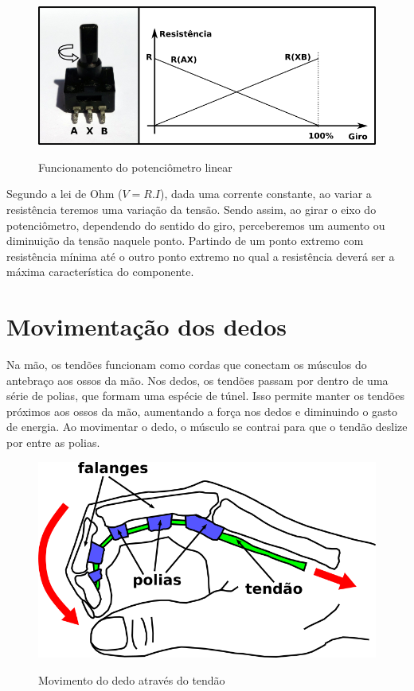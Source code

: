 \documentclass[
	12pt,				%
	openright,			%
	oneside,			%
	a4paper,			%
	english,			%
	brazil				%
	]{abntex2}
\begin{document}
		\begin{figure}[h!]
			\centering
  		\caption{Funcionamento do potenciômetro linear}
  		\includegraphics[scale=0.7]{./figures/potentiometer1.png}
  		\label{Fig:potentiometer1}
		\end{figure}

		Segundo a lei de Ohm ($V = R.I$), dada uma corrente constante, ao variar a resistência teremos uma variação da tensão. Sendo assim, ao girar o eixo do potenciômetro, dependendo do sentido do giro, perceberemos um aumento ou diminuição da tensão naquele ponto. Partindo de um ponto extremo com resistência mínima até o outro ponto extremo no qual a resistência deverá ser a máxima característica do componente.

		\section{Movimentação dos dedos}
		Na mão, os tendões funcionam como cordas que conectam os músculos do antebraço aos ossos da mão. Nos dedos, os tendões passam por dentro de uma série de polias, que formam uma espécie de túnel. Isso permite manter os tendões próximos aos ossos da mão, aumentando a força nos dedos e diminuindo o gasto de energia. Ao movimentar o dedo, o músculo se contrai para que o tendão deslize por entre as polias. \cite{drricardocirurgiao}
 
		\begin{figure}[h!]
			\centering
  		\caption{Movimento do dedo através do tendão}
  		\includegraphics[scale=0.5]{./figures/hand-tendon-flex1.png}
  		\label{Fig:hand-tendon-flex1}
		\end{figure}
\end{document}
